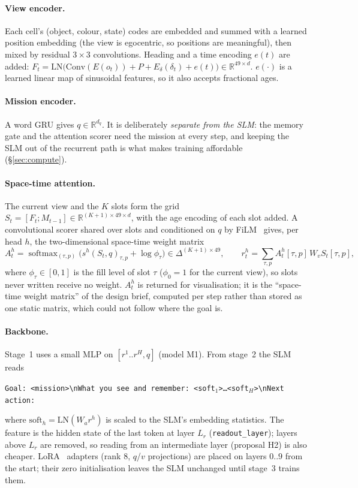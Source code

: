 \documentclass[11pt,a4paper]{article}
\newcommand{\code}[1]{\texttt{\small #1}}
\begin{document}
\paragraph{View encoder.} Each cell's (object, colour, state) codes are embedded and summed with a learned
position embedding (the view is egocentric, so positions are meaningful), then mixed by residual $3\times3$
convolutions. Heading and a time encoding $e(t)$ are added:
$F_t = \mathrm{LN}\big(\mathrm{Conv}(E(o_t)) + P + E_\delta(\delta_t) + e(t)\big) \in \mathbb{R}^{49\times d}$.
$e(\cdot)$ is a learned linear map of sinusoidal features, so it also accepts fractional ages.

\paragraph{Mission encoder.} A word GRU gives $q \in \mathbb{R}^{d_q}$. It is deliberately \emph{separate from the
SLM}: the memory gate and the attention scorer need the mission at every step, and keeping the SLM out of the recurrent
path is what makes training affordable (\S\ref{sec:compute}).

\paragraph{Space-time attention.} The current view and the $K$ slots form the grid
$S_t = [F_t; M_{t-1}] \in \mathbb{R}^{(K+1)\times 49\times d}$, with the age encoding of each slot added. A
convolutional scorer shared over slots and conditioned on $q$ by FiLM~\cite{perez2018film} gives, per head $h$, the
two-dimensional space-time weight matrix
\begin{equation}
A^h_t = \operatorname{softmax}_{(\tau,p)}\big(s^h(S_t, q)_{\tau,p} + \log \phi_\tau\big) \in \Delta^{(K+1)\times 49},
\qquad r^h_t = \textstyle\sum_{\tau,p} A^h_t[\tau,p]\, W_v S_t[\tau,p],
\end{equation}
where $\phi_\tau \in [0,1]$ is the fill level of slot $\tau$ ($\phi_0 = 1$ for the current view), so slots never
written receive no weight. $A^h_t$ is returned for visualisation; it is the ``space-time weight matrix'' of the design
brief, computed per step rather than stored as one static matrix, which could not follow where the goal is.

\paragraph{Backbone.} Stage~1 uses a small MLP on $[r^1..r^H, q]$ (model M1). From stage~2 the SLM reads
\begin{center}
\code{Goal: <mission>\textbackslash nWhat you see and remember: <soft$_1$>…<soft$_H$>\textbackslash nNext action:}
\end{center}
where $\text{soft}_h = \mathrm{LN}(W_a r^h)$ is scaled to the SLM's embedding statistics. The feature is the hidden
state of the last token at layer $L_r$ (\code{readout\_layer}); layers above $L_r$ are removed, so reading from an
intermediate layer (proposal H2) is also cheaper. LoRA~\cite{hu2022lora} adapters (rank 8, $q$/$v$ projections) are
placed on layers $0..9$ from the start; their zero initialisation leaves the SLM unchanged until stage~3 trains them.
\end{document}
